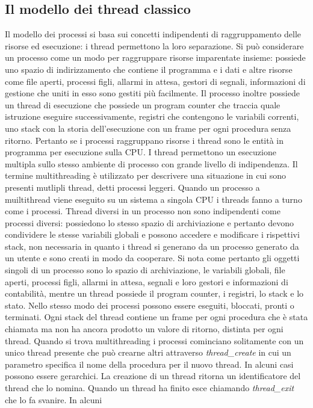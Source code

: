 \subsection{Il modello dei thread classico}
Il modello dei processi si basa sui concetti indipendenti di raggruppamento delle risorse ed esecuzione: i thread permettono la loro separazione. Si pu\`o considerare un processo come
un modo per raggruppare risorse imparentate insieme: possiede uno spazio di indirizzamento che contiene il programma e i dati e altre risorse come file aperti, processi figli, allarmi
in attesa, gestori di segnali, informazioni di gestione che uniti in esso sono gestiti pi\`u facilmente. Il processo inoltre possiede un thread di esecuzione che possiede un program
counter che traccia quale istruzione eseguire successivamente, registri che contengono le variabili correnti, uno stack con la storia dell'esecuzione con un frame per ogni procedura
senza ritorno. Pertanto se i processi raggruppano risorse i thread sono le entit\`a in programma per esecuzione sulla CPU. I thread permettono un esecuzione multipla sullo stesso
ambiente di processo con grande livello di indipendenza. Il termine multithreading \`e utilizzato per descrivere una situazione in cui sono presenti mutlipli thread, detti processi
leggeri. Quando un processo a muiltithread viene eseguito su un sistema a singola CPU i threads fanno a turno come i processi. Thread diversi in un processo non sono indipendenti come
processi diversi: possiedono lo stesso spazio di archiviazione e pertanto devono condividere le stesse variabili globali e possono accedere e modificare i rispettivi stack, non
necessaria in quanto i thread si generano da un processo generato da un utente e sono creati in modo da cooperare. Si nota come pertanto gli oggetti singoli di un processo sono lo
spazio di archiviazione, le variabili globali, file aperti, processi figli, allarmi in attesa, segnali e loro gestori e informazioni di contabilit\`a, mentre un thread possiede il
program counter, i registri, lo stack e lo stato. Nello stesso modo dei processi possono essere eseguiti, bloccati, pronti o terminati. Ogni stack del thread contiene un frame per
ogni procedura che \`e stata chiamata ma non ha ancora prodotto un valore di ritorno, distinta per ogni thread. Quando si trova multithreading i processi cominciano solitamente con un
unico thread presente che pu\`o crearne altri attraverso \emph{thread\_create} in cui un parametro specifica il nome della procedura per il nuovo thread. In alcuni casi possono essere
gerarchici. La creazione di un thread ritorna un identificatore del thread che lo nomina. Quando un thread ha finito esce chiamando \emph{thread\_exit} che lo fa svanire. In alcuni
